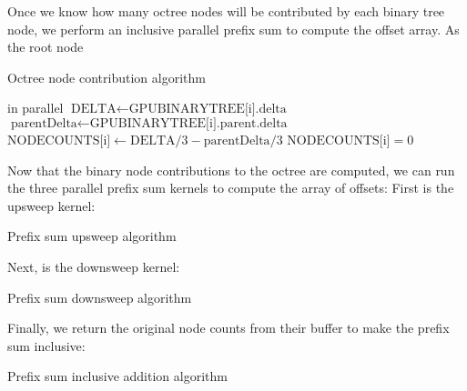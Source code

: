 \documentclass{thesis}
\begin{document}
Once we know how many octree nodes will be contributed by each binary tree node, we perform an inclusive parallel prefix sum to compute the offset array. As the root node 

\begin{algorithm}
    \label{alg:NodeContributions}
    \caption{Octree node contribution algorithm}
    \begin{algorithmic}
         in parallel
                \State $\text{DELTA} \gets \text{GPUBINARYTREE[i].delta}$
                \State $\text{parentDelta} \gets \text{GPUBINARYTREE[i].parent.delta}$
                \State $\text{NODECOUNTS[i]} \gets \text{DELTA}/3 - \text{parentDelta}/3$
            \Else
                \State $\text{NODECOUNTS[i]} = 0$
            \EndIf
        \EndFor
    \end{algorithmic}
\end{algorithm}

Now that the binary node contributions to the octree are computed, we can run the three parallel prefix sum kernels to compute the array of offsets:
First is the upsweep kernel:
\begin{algorithm}
    \label{alg:PrefixUpsweep}
    \caption{Prefix sum upsweep algorithm}
    \begin{algorithmic}
        \For{}
        \EndFor
    \end{algorithmic}
\end{algorithm}

Next, is the downsweep kernel:
\begin{algorithm}
    \label{alg:PrefixDownsweep}
    \caption{Prefix sum downsweep algorithm}
    \begin{algorithmic}
        \For{}
        \EndFor
    \end{algorithmic}
\end{algorithm}

Finally, we return the original node counts from their buffer to make the prefix sum inclusive:
\begin{algorithm}
    \label{alg:PrefixInclusive}
    \caption{Prefix sum inclusive addition algorithm}
    \begin{algorithmic}
        \For{}
        \EndFor
    \end{algorithmic}
\end{algorithm}
\end{document}
